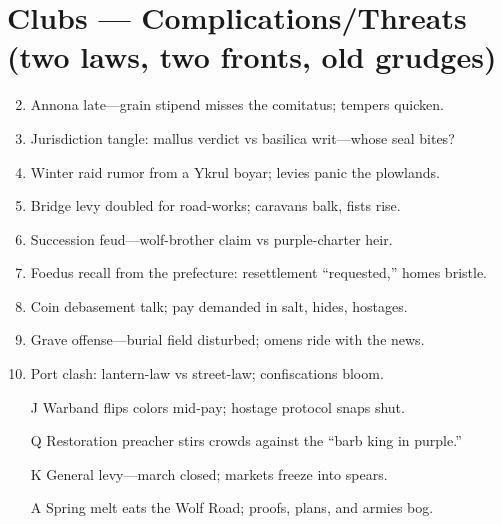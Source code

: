 \section*{Clubs --- Complications/Threats (two laws, two fronts, old grudges)}
\label{sec:vilikari-complications}
\begin{enumerate}
\setcounter{enumi}{1}
\item Annona late---grain stipend misses the comitatus; tempers quicken.
\item Jurisdiction tangle: mallus verdict vs basilica writ---whose seal bites?
\item Winter raid rumor from a Ykrul boyar; levies panic the plowlands.
\item Bridge levy doubled for road-works; caravans balk, fists rise.
\item Succession feud---wolf-brother claim vs purple-charter heir.
\item Foedus recall from the prefecture: resettlement ``requested,'' homes bristle.
\item Coin debasement talk; pay demanded in salt, hides, hostages.
\item Grave offense---burial field disturbed; omens ride with the news.
\item Port clash: lantern-law vs street-law; confiscations bloom.
\item[J] Warband flips colors mid-pay; hostage protocol snaps shut.
\item[Q] Restoration preacher stirs crowds against the ``barb king in purple.''
\item[K] General levy---march closed; markets freeze into spears.
\item[A] Spring melt eats the Wolf Road; proofs, plans, and armies bog.
\end{enumerate}

